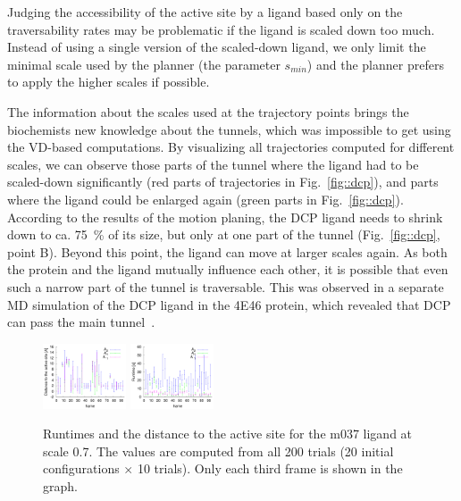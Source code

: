 \documentclass[usletter, 10pt, conference]{ieeeconf} %
\def\smin{s_{min}}
\begin{document}
Judging the accessibility of the active site by a ligand based only on the traversability rates may be problematic if the ligand is scaled down too much.
Instead of using a single version of the scaled-down ligand, we only limit the minimal scale used by the planner (the parameter $\smin$) and
the planner prefers to apply the higher scales if possible.

The information about the scales used at the trajectory points 
brings the biochemists new knowledge about the tunnels, which was impossible to get using the VD-based computations.
By visualizing all trajectories computed for different scales, we can observe those parts of the tunnel where the ligand had to be scaled-down significantly (red parts of trajectories in Fig.~\ref{fig::dcp}), and parts where the ligand could be enlarged again (green parts in Fig.~\ref{fig::dcp}).
According to the results of the motion planing, the DCP ligand needs to shrink down to ca. 75~\% of its size, but only at one part of the tunnel (Fig.~\ref{fig::dcp}, point B). 
Beyond this point, the ligand can move at larger scales again.
As both the protein and the ligand mutually influence each other, it is possible that even such a narrow part of the tunnel is traversable.
This was observed in a separate MD simulation of the DCP ligand in the 4E46 protein, which revealed that DCP can pass the main tunnel~\cite{marques2017catalytic}.



{\def\a{0}
\begin{figure}[t]
\centering
\includegraphics[width=0.22\textwidth,angle=\a]{fig/crop1}
\includegraphics[width=0.22\textwidth,angle=\a]{fig/crop2}
\caption{\label{fig::comparison}
    \small
    Runtimes and the distance to the active site for the m037 ligand at scale 0.7.
    The values are computed from all 200 trials (20 initial configurations $\times$ 10 trials).
    Only each third frame is shown in the graph.
}
\end{figure}
}
\end{document}
